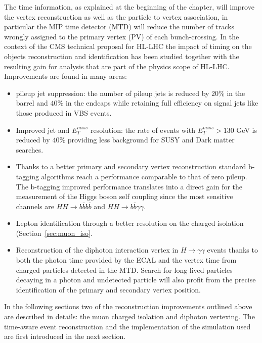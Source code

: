 The time information, as explained at the beginning of the chapter, will improve the vertex reconstruction as
well as the particle to vertex association, in particular the MIP time detector (MTD) will reduce the
number of tracks wrongly assigned to the primary vertex (PV) of each bunch-crossing.
In the context of the CMS technical proposal for HL-LHC the impact of timing on the objects reconstruction and
identification has been studied together with the resulting gain for analysis that are part of the physics scope
of HL-LHC.
Improvements are found in many areas:
\begin{itemize}
\item pileup jet suppression: the number of pileup jets is reduced by $20\%$ in the barrel and $40\%$ in the endcaps
  while retaining full efficiency on signal jets like those produced in VBS events.
\item Improved jet and $E_T^{miss}$ resolution: the rate of events with $E_T^{miss}>130$ GeV is reduced by
  $40\%$ providing less background for SUSY and Dark matter searches.
\item Thanks to a better primary and secondary vertex reconstruction standard b-tagging algorithms reach
  a performance comparable to that of zero pileup. The b-tagging improved performance translates into
  a direct gain for the measurement of the Higgs boson self coupling since the most sensitive channels
  are $HH\to b\bar{b}b\bar{b}$ and $HH \to b\bar{b}\gamma\gamma$. 
\item Lepton identification through a better resolution on the charged isolation (Section~\ref{sec:muon_iso}.
\item Reconstruction of the diphoton interaction vertex in $H\to\gamma\gamma$ events thanks to both the photon time
  provided by the ECAL and the vertex time from charged particles detected in the MTD. Search for long lived particles
  decaying in a photon and undetected particle will also profit from the precise identification of the primary and
  secondary vertex position. 
\end{itemize}

In the following sections two of the reconstruction improvements outlined above are described in details:
the muon charged isolation and diphoton vertexing. The time-aware event reconstruction and the implementation
of the simulation used are first introduced in the next section.

